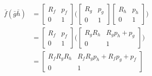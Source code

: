 \documentclass[12pt]{article}
\begin{document}
\begin{enumerate}
\begin{enumerate}
                        \begin{align} 
                            \bar{f}(\bar{g}\bar{h}) &= \begin{bmatrix} 
                                                            R_f & p_f \\ 
                                                            0 & 1
                                                        \end{bmatrix}
                                                        \big(\begin{bmatrix} 
                                                            R_g & p_g \\ 
                                                            0 & 1
                                                        \end{bmatrix}
                                                        \begin{bmatrix} 
                                                            R_h & p_h \\ 
                                                            0 & 1
                                                        \end{bmatrix}\big)\\
                                                    &= \begin{bmatrix} 
                                                            R_f & p_f \\ 
                                                            0 & 1
                                                        \end{bmatrix}
                                                        \big(\begin{bmatrix}
                                                                R_g R_h & R_g p_h + p_g\\ 
                                                                0 & 1
                                                            \end{bmatrix}\big)\\
                                                    &= \begin{bmatrix}
                                                                R_f R_g R_h & R_f R_g p_h + R_f p_g + p_f\\ 
                                                                0 & 1
                                                        \end{bmatrix}
                        \end{align}
                        

\end{enumerate}
\end{enumerate}
\end{document}
